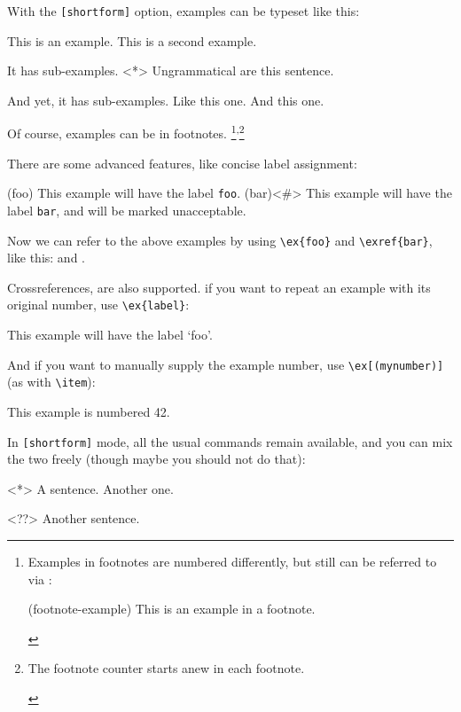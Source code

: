 \documentclass{article}
\begin{document}
%
\noindent With the \verb|[shortform]| option, examples can be typeset like this:
    \begin{exe}
        \ex This is an example.
        \ex This is a second example.
              \begin{exe}
                  \ex It has sub-examples.
                  \ex<*> Ungrammatical are this sentence.
                        \begin{exe}
                            \ex And yet, it has sub-examples. Like this one.
                            \ex And this one.
                        \end{exe}
              \end{exe}
    \end{exe}
Of course, examples can be in footnotes.%
\footnote{%
  Examples in footnotes are numbered differently, but still can be referred
  to via :
  \begin{examples}
      \item(footnote-example) This is an example in a footnote.
  \end{examples}
}\textsuperscript{,}\footnote{%
  \begin{examples}
      \item The footnote counter starts anew in each footnote.
  \end{examples}
}

There are some advanced features, like concise label assignment:%

\begin{exe}
    \ex(foo) This example will have the label \verb|foo|.
    \ex(bar)<\#> This example will have the label \verb|bar|, and will be marked 
                unacceptable.
\end{exe}
%
Now we can refer to the above examples by using \verb|\ex{foo}| and \verb|\exref{bar}|, like this:  and .

Crossreferences, are also supported. if you want to repeat an example with its original 
number, use \verb|\ex{label}|:
\begin{exe}
     This example will have the label `foo'.
\end{exe}
%
And if you want to manually supply the example number, use \verb|\ex[(mynumber)]| (as with \verb|\item|):
\begin{exe}
    \ex[(42)] This example is numbered 42.
\end{exe}
%
In \verb|[shortform]| mode, all the usual commands remain available, 
and you can mix the two freely (though maybe you should not do that):
\begin{exe}
  \item<*> A sentence.
  \ex Another one.
\end{exe}
\begin{examples}
  \ex<??> Another sentence.
\end{examples}
\end{document}
